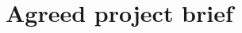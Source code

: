 \chapter{Agreed project brief}
\label{Appendix:brief}

\begin{figure}
\centering

\end{figure}

\clearpage
